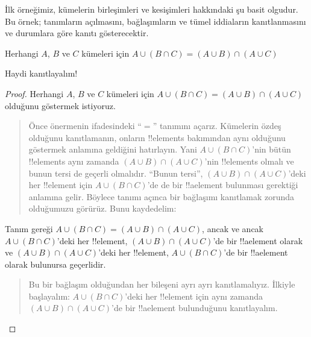 \documentclass[../../../include/open-logic-section]{subfiles}
\begin{document}


İlk örneğimiz, kümelerin birleşimleri ve kesişimleri hakkındaki şu
basit olgudur. Bu örnek; tanımların açılmasını, bağlaşımların ve tümel
iddiaların kanıtlanmasını ve durumlara göre kanıtı gösterecektir.

\begin{prop}
Herhangi $A$, $B$ ve $C$ kümeleri için $A \cup (B \cap C) = (A \cup B)
\cap (A \cup C)$
\end{prop}

Haydi kanıtlayalım!{}

\begin{proof}
Herhangi $A$, $B$ ve $C$ kümeleri için $A \cup (B \cap C) = (A \cup
B) \cap (A \cup C)$ olduğunu göstermek istiyoruz.
\begin{quote}
Önce önermenin ifadesindeki ``$=$'' tanımını açarız. Kümelerin özdeş
olduğunu kanıtlamanın, onların !!{element}s bakımından aynı olduğunu
göstermek anlamına geldiğini hatırlayın. Yani $A \cup (B \cap C)$'nin
bütün !!{element}s aynı zamanda $(A \cup B) \cap (A \cup C)$'nin
!!{element}s olmalı ve bunun tersi de geçerli olmalıdır. ``Bunun
tersi'', $(A \cup B) \cap (A \cup C)$'deki her !!{element} için $A
\cup (B \cap C)$'de de bir !!a{element} bulunması gerektiği anlamına
gelir. Böylece tanımı açınca bir bağlaşımı kanıtlamak zorunda olduğumuzu
görürüz. Bunu kaydedelim:
\end{quote}
Tanım gereği $A \cup (B \cap C) = (A \cup B) \cap (A \cup C)$, ancak
ve ancak $A \cup (B \cap C)$'deki her !!{element}, $(A \cup B) \cap (A
\cup C)$'de bir !!a{element} olarak ve $(A \cup B) \cap (A \cup C)$'deki
her !!{element}, $A \cup (B \cap C)$'de bir !!a{element} olarak bulunursa geçerlidir.
\begin{quote}
Bu bir bağlaşım olduğundan her bileşeni ayrı ayrı kanıtlamalıyız.
İlkiyle başlayalım: $A \cup (B \cap C)$'deki her !!{element} için aynı
zamanda $(A \cup B) \cap (A \cup C)$'de bir !!a{element} bulunduğunu
kanıtlayalım.


\end{quote}
\end{proof}
\end{document}
